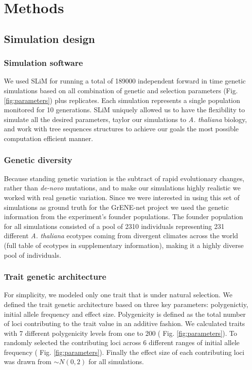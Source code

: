 \documentclass{article}
\begin{document}
\section{Methods}

\subsection{Simulation design}

\subsubsection{Simulation software}
We used SLiM \citep{Haller2019-oj} for running a total of 189000 independent forward in time genetic simulations based on all combination of genetic and selection parameters (Fig. \ref{fig:parameters}) plus replicates. Each simulation represents a single population monitored for 10 generations. SLiM uniquely allowed us to have the flexibility to simulate all the desired parameters, taylor our simulations to \textit{A. thaliana} biology, and work with tree sequences structures to achieve our goals the most possible computation efficient manner.

\subsubsection{Genetic diversity}
Because standing genetic variation is the subtract of rapid evolutionary changes, rather than \textit{de-novo} mutations, and to make our simulations highly realistic we worked with real genetic variation. Since we were interested in using this set of simulations as ground truth for the GrENE-net project we used the genetic information from the experiment's founder populations. The founder population for all simulations consisted of a pool of 2310 individuals representing 231 different \textit{A. thaliana} ecotypes coming from divergent climates across the world (full table of ecotypes in supplementary information), making it a highly diverse pool of individuals. 

\subsubsection{Trait genetic architecture}
For simplicity, we modeled only one trait that is under natural selection. We defined the trait genetic architecture based on three key parameters: polygenictiy, initial allele frequency and effect size. Polygenicity is defined as the total number of loci contributing to the trait value in an additive fashion. We calculated traits with 7 different polygenicity levels from one to 200 ( Fig. \ref{fig:parameters}). To randomly selected the contributing loci across 6 different ranges of initial allele frequency ( Fig. \ref{fig:parameters}). Finally the effect size of each contributing loci was drawn from \( \sim N(0, 2) \) for all simulations.
\end{document}
